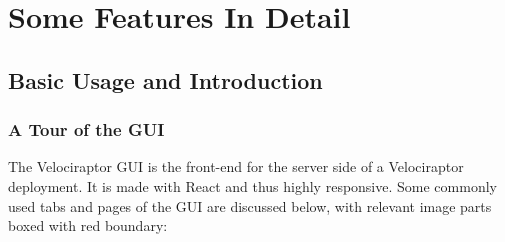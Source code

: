 \documentclass[a4paper, 11pt, oneside]{article} %
\begin{document}
\section{Some Features In Detail}

\subsection{Basic Usage and Introduction}

\subsubsection{A Tour of the GUI}
The Velociraptor GUI is the front-end for the server side of a Velociraptor deployment. It is made with React and thus highly responsive. Some commonly used tabs and pages of the GUI are discussed below, with relevant image parts boxed with red boundary:
\end{document}
